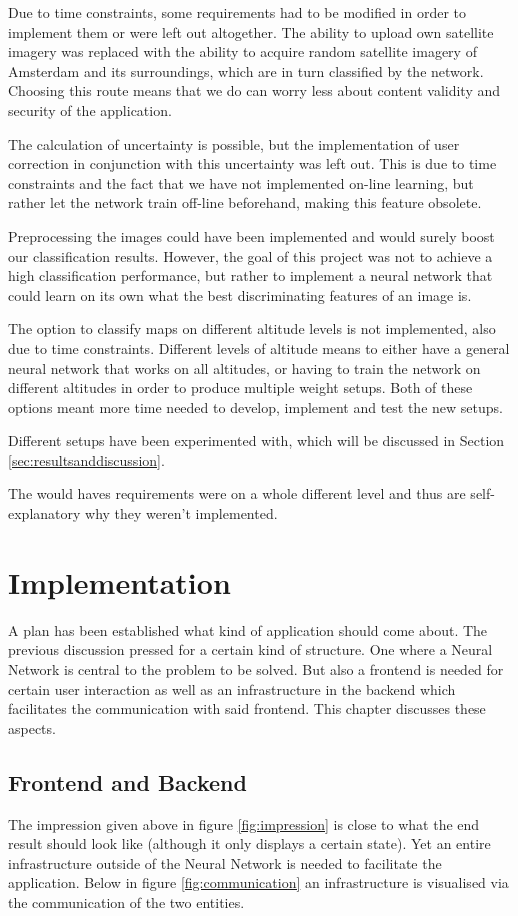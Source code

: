 \documentclass[a4paper,onecolumn]{report}
\begin{document}
Due to time constraints, some requirements had to be modified in order to implement them or were left out altogether. The ability to upload own satellite imagery was replaced with the ability to acquire random satellite imagery of Amsterdam and its surroundings, which are in turn classified by the network. Choosing this route means that we do can worry less about content validity and security of the application.

The calculation of uncertainty is possible, but the implementation of user correction in conjunction with this uncertainty was left out. This is due to time constraints and the fact that we have not implemented on-line learning, but rather let the network train off-line beforehand, making this feature obsolete.

Preprocessing the images could have been implemented and would surely boost our classification results. However, the goal of this project was not to achieve a high classification performance, but rather to implement a neural network that could learn on its own what the best discriminating features of an image is.

The option to classify maps on different altitude levels is not implemented, also due to time constraints. Different levels of altitude means to either have a general neural network that works on all altitudes, or having to train the network on different altitudes in order to produce multiple weight setups. Both of these options meant more time needed to develop, implement and test the new setups. 

Different setups have been experimented with, which will be discussed in Section \ref{sec:resultsanddiscussion}.

The would haves requirements were on a whole different level and thus are self-explanatory why they weren't implemented.



\chapter{Implementation}
A plan has been established what kind of application should come about. The previous discussion pressed for a certain kind of structure. One where a Neural Network is central to the problem to be solved. But also a frontend is needed for certain user interaction as well as an infrastructure in the backend which facilitates the communication with said frontend. This chapter discusses these aspects.

\section{Frontend and Backend}
The impression given above in figure \ref{fig:impression} is close to what the end result should look like (although it only displays a certain state). Yet an entire infrastructure outside of the Neural Network is needed to facilitate the application. Below in figure \ref{fig:communication} an infrastructure is visualised via the communication of the two entities.
\end{document}
